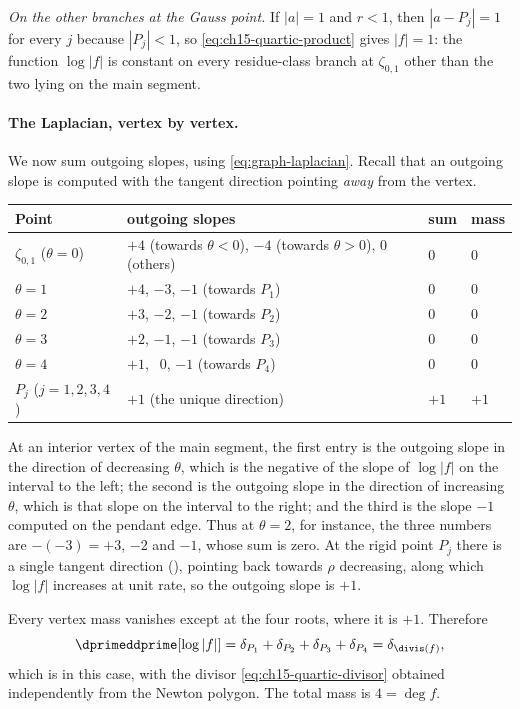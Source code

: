 \emph{On the other branches at the Gauss point.}  If $|a|=1$ and $r<1$, then
$|a-P_j|=1$ for every $j$ because $|P_j|<1$, so
\eqref{eq:ch15-quartic-product} gives $|f|=1$: the function $\log|f|$ is
constant on every residue-class branch at $\zeta_{0,1}$ other than the two
lying on the main segment.

\paragraph{The Laplacian, vertex by vertex.}
We now sum outgoing slopes, using \eqref{eq:graph-laplacian}.  Recall that an
outgoing slope is computed with the tangent direction pointing \emph{away}
from the vertex.
\begin{center}
\small
\begin{tabular}{@{}llll@{}}
\toprule
Point & outgoing slopes & sum & mass \\
\midrule
$\zeta_{0,1}$ ($\theta=0$)
 & $+4$ (towards $\theta<0$), $-4$ (towards $\theta>0$), $0$ (others)
 & $0$ & $0$\\
$\theta=1$
 & $+4$, $-3$, $-1$ (towards $P_1$) & $0$ & $0$\\
$\theta=2$
 & $+3$, $-2$, $-1$ (towards $P_2$) & $0$ & $0$\\
$\theta=3$
 & $+2$, $-1$, $-1$ (towards $P_3$) & $0$ & $0$\\
$\theta=4$
 & $+1$, $\ \ 0$, $-1$ (towards $P_4$) & $0$ & $0$\\
$P_j$ ($j=1,2,3,4$)
 & $+1$ (the unique direction) & $+1$ & $+1$\\
\bottomrule
\end{tabular}
\end{center}
At an interior vertex of the main segment, the first entry is the outgoing
slope in the direction of decreasing $\theta$, which is the negative of the
slope of $\log|f|$ on the interval to the left; the second is the outgoing
slope in the direction of increasing $\theta$, which is that slope on the
interval to the right; and the third is the slope $-1$ computed on the
pendant edge.  Thus at $\theta=2$, for instance, the three numbers are
$-(-3)=+3$, $-2$ and $-1$, whose sum is zero.  At the rigid point $P_j$ there
is a single tangent direction (), pointing back towards
$\rho$ decreasing, along which $\log|f|$ increases at unit rate, so the
outgoing slope is $+1$.

Every vertex mass vanishes except at the four roots, where it is $+1$.
Therefore
\[
 \dprimeddprime[\log|f|]
 =\delta_{P_1}+\delta_{P_2}+\delta_{P_3}+\delta_{P_4}
 =\delta_{\divis(f)},
\]
which is  in this case, with the divisor
\eqref{eq:ch15-quartic-divisor} obtained independently from the Newton
polygon.  The total mass is $4=\deg f$.

